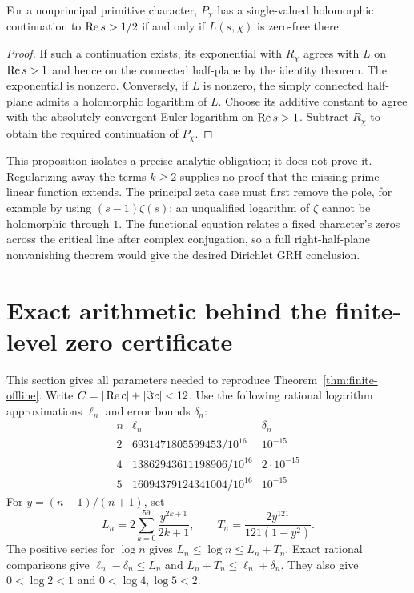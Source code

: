 \begin{proposition}\label{prop:prime-linear}
For a nonprincipal primitive character, $P_\chi$ has a single-valued
holomorphic continuation to $\operatorname{Re} s>1/2$ if and only if
$L(s,\chi)$ is zero-free there.
\end{proposition}
\begin{proof}
If such a continuation exists, its exponential with $R_\chi$ agrees
with $L$ on $\operatorname{Re} s>1$ and hence on the connected half-plane by the
identity theorem. The exponential is nonzero. Conversely, if $L$ is
nonzero, the simply connected half-plane admits a holomorphic logarithm
of $L$. Choose its additive constant to agree with the absolutely
convergent Euler logarithm on $\operatorname{Re} s>1$. Subtract $R_\chi$ to obtain
the required continuation of $P_\chi$.
\end{proof}
This proposition isolates a precise analytic obligation; it does not prove it.
Regularizing away the terms $k\ge2$ supplies no proof that the missing
prime-linear function extends. The principal zeta case must first remove
the pole, for example by using $(s-1)\zeta(s)$; an unqualified logarithm
of $\zeta$ cannot be holomorphic through $1$.
The functional equation relates a fixed character's zeros across the
critical line after complex conjugation, so a full right-half-plane
nonvanishing theorem would give the desired Dirichlet GRH conclusion.

\section{Exact arithmetic behind the finite-level zero certificate}
This section gives all parameters needed to reproduce
Theorem~\ref{thm:finite-offline}. Write $C=|\operatorname{Re} c|+|\Im c|<12$.
Use the following rational logarithm approximations $\ell_n$ and error
bounds $\delta_n$:
\[
\begin{array}{c|c|c}
 n&\ell_n&\delta_n\\\hline
 2&6931471805599453/10^{16}&10^{-15}\\
 4&13862943611198906/10^{16}&2\cdot10^{-15}\\
 5&16094379124341004/10^{16}&10^{-15}
\end{array}
\]
For $y=(n-1)/(n+1)$, set
\[
 L_n=2\sum_{k=0}^{59}\frac{y^{2k+1}}{2k+1},\qquad
 T_n=\frac{2y^{121}}{121(1-y^2)}.
\]
The positive series for $\log n$ gives $L_n\le\log n\le L_n+T_n$.
Exact rational comparisons give
$\ell_n-\delta_n\le L_n$ and $L_n+T_n\le\ell_n+\delta_n$.
They also give $0<\log2<1$ and $0<\log4,\log5<2$.

